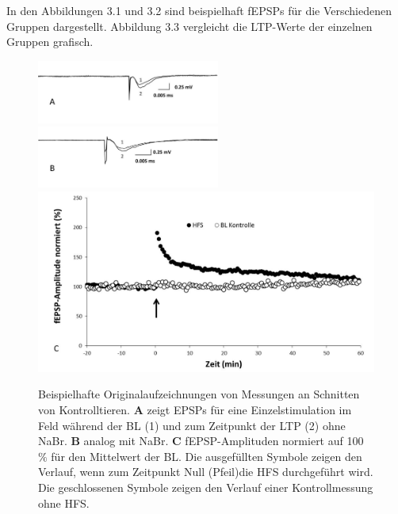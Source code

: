 \documentclass[a4paper,11pt]{report}
\begin{document}
{In den Abbildungen 3.1 und 3.2 sind beispielhaft fEPSPs für die Verschiedenen Gruppen dargestellt. Abbildung 3.3 vergleicht die LTP-Werte der einzelnen Gruppen grafisch.

\begin{figure}
\begin{center}
\includegraphics[width=6cm]{Abbildungen/feld_samples/field_k_c.jpg}
\includegraphics[width=6cm]{Abbildungen/feld_samples/field_k_br.jpg}
\includegraphics[width=13cm]{Abbildungen/feld_samples/ltp_k_chfs_mean}
\caption{Beispielhafte Originalaufzeichnungen von Messungen an Schnitten von Kontrolltieren. \textbf{A} zeigt EPSPs für eine Einzelstimulation im Feld während der BL (1) und zum Zeitpunkt der LTP (2) ohne NaBr. \textbf{B} analog mit NaBr. \textbf{C} fEPSP-Amplituden normiert auf 100 $\%$ für den Mittelwert der BL. Die ausgefüllten Symbole zeigen den  Verlauf, wenn zum Zeitpunkt Null (Pfeil)die HFS durchgeführt wird. Die geschlossenen Symbole zeigen den Verlauf einer Kontrollmessung ohne HFS.}
\end{center}
\end{figure}

}
\end{document}
